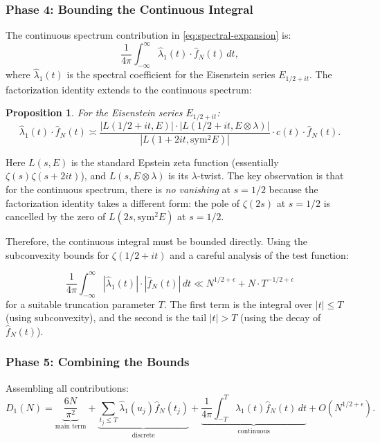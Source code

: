 \documentclass[11pt,a4paper]{article}
\theoremstyle{plain}
\newtheorem{proposition}[theorem]{Proposition}
\theoremstyle{definition}
\newcommand{\sym}{\mathrm{sym}}
\begin{document}
\subsubsection{Phase 4: Bounding the Continuous Integral}

The continuous spectrum contribution in \eqref{eq:spectral-expansion} is:
\begin{equation}
\label{eq:continuous}
\frac{1}{4\pi} \int_{-\infty}^{\infty} \hat{\lambda}_1(t) \cdot \hat{f}_N(t) \, dt,
\end{equation}
where $\hat{\lambda}_1(t)$ is the spectral coefficient for the Eisenstein series $E_{1/2+it}$. The factorization identity extends to the continuous spectrum:

\begin{proposition}
\label{prop:continuous-factorization}
For the Eisenstein series $E_{1/2+it}$:
\[
\hat{\lambda}_1(t) \cdot \hat{f}_N(t) \asymp \frac{|L(1/2+it, E)| \cdot |L(1/2+it, E \otimes \lambda)|}{|L(1+2it, \sym^2 E)|} \cdot c(t) \cdot \hat{f}_N(t).
\]
\end{proposition}

Here $L(s, E)$ is the standard Epstein zeta function (essentially $\zeta(s)\zeta(s+2it)$), and $L(s, E \otimes \lambda)$ is its $\lambda$-twist. The key observation is that for the continuous spectrum, there is \emph{no vanishing} at $s = 1/2$ because the factorization identity takes a different form: the pole of $\zeta(2s)$ at $s = 1/2$ is cancelled by the zero of $L(2s, \sym^2 E)$ at $s = 1/2$.

Therefore, the continuous integral must be bounded directly. Using the subconvexity bounds for $\zeta(1/2+it)$ and a careful analysis of the test function:

\begin{equation}
\label{eq:continuous-bound}
\frac{1}{4\pi} \int_{-\infty}^{\infty} |\hat{\lambda}_1(t)| \cdot |\hat{f}_N(t)| \, dt \ll N^{1/2+\epsilon} + N \cdot T^{-1/2+\epsilon}
\end{equation}
for a suitable truncation parameter $T$. The first term is the integral over $|t| \leq T$ (using subconvexity), and the second is the tail $|t| > T$ (using the decay of $\hat{f}_N(t)$).

\subsubsection{Phase 5: Combining the Bounds}

Assembling all contributions:
\begin{equation}
\label{eq:combined}
D_1(N) = \underbrace{\frac{6N}{\pi^2}}_{\text{main term}} + \underbrace{\sum_{t_j \leq T} \hat{\lambda}_1(u_j) \hat{f}_N(t_j)}_{\text{discrete}} + \underbrace{\frac{1}{4\pi} \int_{-T}^{T} \hat{\lambda}_1(t) \hat{f}_N(t) \, dt}_{\text{continuous}} + O(N^{1/2+\epsilon}).
\end{equation}
\end{document}
